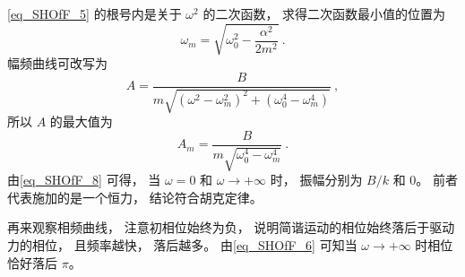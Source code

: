 \autoref{eq_SHOfF_5} 的根号内是关于 $\omega^2$ 的二次函数， 求得二次函数最小值的位置为
\begin{equation}
\omega_m = \sqrt{\omega_0^2 - \frac{\alpha^2}{2m^2}}~.
\end{equation}
幅频曲线可改写为
\begin{equation}\label{eq_SHOfF_8}
A = \frac{B}{m\sqrt{(\omega^2 - \omega_m^2)^2 + (\omega_0^4 - \omega_m^4)}}~,
\end{equation}
所以 $A$ 的最大值为
\begin{equation}
A_m = \frac{B}{m\sqrt{\omega_0^4 - \omega_m^4}}~.
\end{equation}
由\autoref{eq_SHOfF_8} 可得， 当 $\omega = 0$ 和 $\omega\to +\infty$ 时， 振幅分别为 $B/k$ 和 $0$。 前者代表施加的是一个恒力， 结论符合胡克定律。

再来观察相频曲线， 注意初相位始终为负， 说明简谐运动的相位始终落后于驱动力的相位， 且频率越快， 落后越多。 由\autoref{eq_SHOfF_6} 可知当 $\omega\to +\infty$ 时相位恰好落后 $\pi$。



